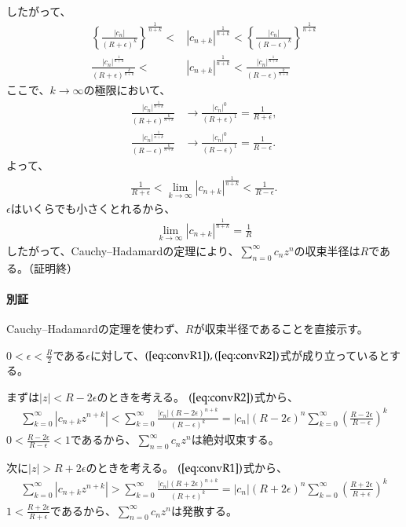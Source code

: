 したがって、
\begin{align*}
    \left\{\frac{|c_{n}|}{(R+\epsilon)^k}\right\}^\frac{1}{n+k}<&|c_{n+k}|^\frac{1}{n+k}< \left\{\frac{|c_{n}|}{(R-\epsilon)^k}\right\}^\frac{1}{n+k}\\
    \frac{|c_{n}|^\frac{1}{n+k}}{(R+\epsilon)^\frac{k}{n+k}}<&|c_{n+k}|^\frac{1}{n+k}< \frac{|c_{n}|^\frac{1}{n+k}}{(R-\epsilon)^\frac{k}{n+k}}
\end{align*}
ここで、$k\longrightarrow\infty$の極限において、
\begin{align*}
    \frac{|c_{n}|^\frac{1}{n+k}}{(R+\epsilon)^\frac{k}{n+k}}&\longrightarrow \frac{|c_{n}|^0}{(R+\epsilon)^1}=\frac{1}{R+\epsilon},\\
    \frac{|c_{n}|^\frac{1}{n+k}}{(R-\epsilon)^\frac{k}{n+k}}&\longrightarrow \frac{|c_{n}|^0}{(R-\epsilon)^1}=\frac{1}{R-\epsilon}.
\end{align*}
よって、
\begin{align*}
    \frac{1}{R+\epsilon}<\lim_{k\to\infty}|c_{n+k}|^\frac{1}{n+k}<\frac{1}{R-\epsilon}.
\end{align*}
$\epsilon$はいくらでも小さくとれるから、
\begin{align*}
    \lim_{k\to\infty}|c_{n+k}|^\frac{1}{n+k}=\frac{1}{R}
\end{align*}
したがって、Cauchy--Hadamardの定理により、$\sum_{n=0}^\infty c_nz^n$の収束半径は$R$である。（証明終）

\paragraph{別証}
Cauchy--Hadamardの定理を使わず、$R$が収束半径であることを直接示す。

$0<\epsilon<\frac{R}{2}$である$\epsilon$に対して、$(\ref{eq:convR1}),(\ref{eq:convR2})$式が成り立っているとする。

まずは$|z|<R-2\epsilon$のときを考える。
$(\ref{eq:convR2})$式から、
\begin{align*}
    \sum_{k=0}^\infty |c_{n+k}z^{n+k}|
    <\sum_{k=0}^\infty \frac{|c_n|(R-2\epsilon)^{n+k}}{(R-\epsilon)^k}=|c_n|(R-2\epsilon)^n\sum_{k=0}^\infty \left(\frac{R-2\epsilon}{R-\epsilon}\right)^k
\end{align*}
$0<\frac{R-2\epsilon}{R-\epsilon}<1$であるから、$\sum_{n=0}^\infty c_nz^n$は絶対収束する。

次に$|z|>R+2\epsilon$のときを考える。
$(\ref{eq:convR1})$式から、
\begin{align*}
    \sum_{k=0}^\infty |c_{n+k}z^{n+k}|
    >\sum_{k=0}^\infty \frac{|c_n|(R+2\epsilon)^{n+k}}{(R+\epsilon)^k}=|c_n|(R+2\epsilon)^n\sum_{k=0}^\infty \left(\frac{R+2\epsilon}{R+\epsilon}\right)^k
\end{align*}
$1<\frac{R+2\epsilon}{R+\epsilon}$であるから、$\sum_{n=0}^\infty c_nz^n$は発散する。

